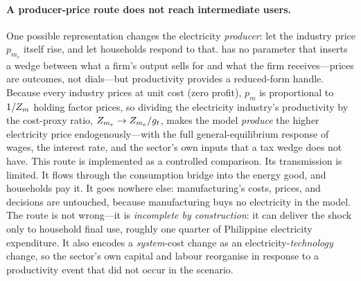 \paragraph{A producer-price route does not reach intermediate users.}
One possible representation changes the electricity
\emph{producer}: let the industry price $p_{m_e}$ itself rise, and let households
respond to that. \OGCore{} has no parameter that inserts a wedge between what a
firm's output sells for and what the firm receives---prices are outcomes, not
dials---but productivity provides a reduced-form handle. Because every industry prices at unit
cost (zero profit), $p_m$ is proportional to $1/Z_m$ holding factor prices, so
dividing the electricity industry's productivity by the cost-proxy ratio,
$Z_{m_e}\to Z_{m_e}/g_t$, makes the model \emph{produce} the higher electricity
price endogenously---with the full general-equilibrium response of wages, the
interest rate, and the sector's own inputs that a tax wedge does not have. This route
is implemented as a controlled comparison. Its transmission is limited.
It flows through the consumption bridge into the energy good, and households pay it.
It goes nowhere else: manufacturing's costs, prices, and decisions are untouched,
because manufacturing buys no electricity in the model. The route is not wrong---it is
\emph{incomplete by construction}: it can deliver the shock only to household final
use, roughly one quarter of Philippine electricity expenditure. It also
encodes a \emph{system}-cost change as an electricity-\emph{technology} change, so the
sector's own capital and labour reorganise in response to a productivity event that
did not occur in the scenario.

